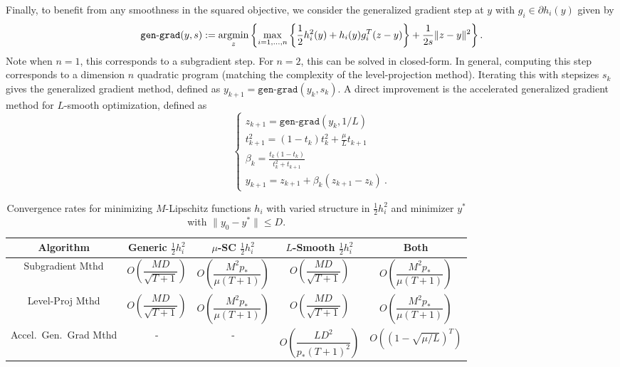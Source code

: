 \documentclass[sn-mathphys,Numbered]{sn-jnl}%
\newcommand{\argmin}{\operatornamewithlimits{argmin}}
\begin{document}
Finally, to benefit from any smoothness in the squared objective, we consider the generalized gradient step at $y$ with $g_i\in\partial h_i(y)$ given by
\begin{equation}
    \mathtt{gen\mbox{-}grad}(y,s) :=\argmin_{z}\left\{\max_{i=1, \dots ,n}\left\{\frac{1}{2}h^2_i(y) + h_i(y)g_i^T(z-y)\right\} + \frac{1}{2s}\|z-y\|^2\right\}. \label{eq:general-grad-step}
\end{equation}
Note when $n=1$, this corresponds to a subgradient step. For $n=2$, this can be solved in closed-form. In general, computing this step corresponds to a dimension $n$ quadratic program (matching the complexity of the level-projection method). Iterating this with stepsizes $s_k$ gives the generalized gradient method, defined as $y_{k+1} = \mathtt{gen\mbox{-}grad}(y_k,s_k)$.
A direct improvement is the accelerated generalized gradient method for $L$-smooth optimization, defined as
\begin{equation} \label{eq:accel-method}
    \begin{cases}
    z_{k+1} = \mathtt{gen\mbox{-}grad}(y_k,1/L) \\
    t_{k+1}^2= (1-t_k)t_k^2+\frac{\mu}{L}t_{k+1} \\
    \beta_k = \frac{t_k(1-t_k)}{t^2_k+t_{k+1}} \\
    y_{k+1}=z_{k+1}+\beta_k(z_{k+1}-z_k) \ . 
    \end{cases}
\end{equation}

\begin{table}
	{\small
		\centering
			\renewcommand{\arraystretch}{2}
			\begin{tabular}{|c|c|c|c|c|}\hline
				Algorithm & Generic $\frac{1}{2}h^2_i$ & $\mu$-SC $\frac{1}{2}h^2_i$ & $L$-Smooth $\frac{1}{2}h^2_i$ & Both\\ \hline
				Subgradient Mthd & $O\left(\dfrac{MD}{\sqrt{T+1}}\right)$ & $O\left(\dfrac{M^2p_*}{\mu(T+1)}\right)$ & $O\left(\dfrac{MD}{\sqrt{T+1}}\right)$ & $O\left(\dfrac{M^2p_*}{\mu(T+1)}\right)$ \\
				Level-Proj Mthd & $O\left(\dfrac{MD}{\sqrt{T+1}}\right)$ & $O\left(\dfrac{M^2p_*}{\mu(T+1)}\right)$ & $O\left(\dfrac{MD}{\sqrt{T+1}}\right)$ & $O\left(\dfrac{M^2p_*}{\mu(T+1)}\right)$  \\
				Accel.~Gen.~Grad Mthd & - & - & $O\left(\dfrac{LD^2}{p_*(T+1)^2}\right)$ & $O\left((1-\sqrt{\mu/L})^T\right)$ \\
                \hline
			\end{tabular}
	}
 \caption{Convergence rates for minimizing $M$-Lipschitz functions $h_i$ with varied structure in $\frac{1}{2}h_i^2$ and minimizer $y^*$ with $\|y_0-y^*\|\leq D$.}  \label{tab:rates}
\end{table}
\end{document}
